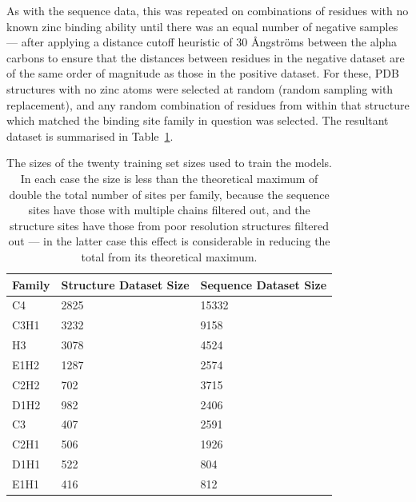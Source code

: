 As with the sequence data, this was repeated on combinations of residues with no known zinc binding ability until there was an equal number of negative samples --- after applying a distance cutoff heuristic of 30 {\AA}ngstr\"{o}ms between the alpha carbons to ensure that the distances between residues in the negative dataset are of the same order of magnitude as those in the positive dataset. For these, PDB structures with no zinc atoms were selected at random (random sampling with replacement), and any random combination of residues from within that structure which matched the binding site family in question was selected. The resultant dataset is summarised in Table~\ref{tab:dataset-size}.

\begin{table}
  \caption[Training set size.]{\label{tab:dataset-size}The sizes of the twenty training set sizes used to train the models. In each case the size is less than the theoretical maximum of double the total number of sites per family, because the sequence sites have those with multiple chains filtered out, and the structure sites have those from poor resolution structures filtered out --- in the latter case this effect is considerable in reducing the total from its theoretical maximum.}
\begin{center}
\begin{tabular}{lll} \hline
Family & Structure Dataset Size & Sequence Dataset Size \\ \hline
C4     & 2825         &  15332  \\
C3H1   & 3232         &  9158   \\
H3     & 3078         &  4524   \\
E1H2   & 1287         &  2574   \\
C2H2   &  702         &  3715   \\
D1H2   &  982         &  2406   \\
C3     &  407         &  2591   \\
C2H1   &  506         &  1926   \\
D1H1   &  522         &  804    \\ 
E1H1   &  416         &  812    \\ \hline
\end{tabular}
\end{center}
\end{table}

